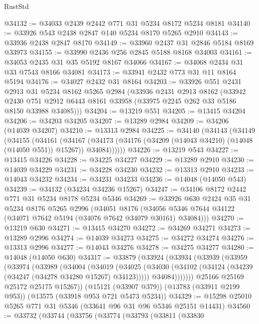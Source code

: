 \begin{lexlean}{RustStd}
\begin{coremodule}
@34132 := @34033 @2439 @2442 @771 @31 @5234 @8172 @5234 @8181
@34140 := @33926 @543 @2438 @2847 @140 @5234 @8170 @5265 @2910
@34143 := @33936 @2438 @2847 @8170
@34149 := @33960 @2437 @31 @2846 @5184 @8169 @33973
@34155 := @33990 @2436 @256 @2845 @5188 @8168 @34003
@34161 := @34053 @2435 @31 @35 @5192 @8167 @34066
@34167 := @34068 @2434 @31 @33 @7543 @8166 @34081
@34173 := @33941 @2432 @773 @31 @11 @8164 @5194
@34176 := @34027 @2432 @31 @8164
@34203 := @33926
    @551
    @2431
    @2913
    @31
    @5234
    @8162
    @5265
    @2984
    (@33936
      @2431
      @2913
      @8162
      (@33942
        @2430
        @751
        @2912
        @6443
        @8161
        @33958
        (@33975 @2245 @262 @33 @5186 @8150 @33988 @34085)))
@34204 := @13219 @551
@34205 := @13415 @34204
@34206 := @34203 @34205
@34207 := @13289 @2984
@34209 := @34206 (@14039 @34207)
@34210 := @13313 @2984
@34225 := @34140
    (@34143
      (@34149
        (@34155
          (@34161
            (@34167
              (@34173 (@34176 (@34209 (@14043 @34210) (@14048 (@14050 @551)) @15267)) @34084))))))
@34226 := @13219 @543
@34227 := @13415 @34226
@34228 := @34225 @34227
@34229 := @13289 @2910
@34230 := @14039 @34229
@34231 := @34228 @34230
@34232 := @13313 @2910
@34233 := @14043 @34232
@34234 := @34231 @34233
@34236 := @14048 (@14050 @543)
@34239 := @34132 (@34234 @34236 @15267)
@34247 := @34106 @8172 @2442 @771 @31 @5234 @8178 @5234 @5346
@34269 := @33926
    @630
    @2424
    @35
    @31
    @5234
    @8176
    @5265
    @2996
    (@34051
      @8176
      (@34056 @5346 @7644 @34122 (@34071 @7642 @5194 (@34076 @7642 @34079 @30161) @34084)))
@34270 := @13219 @630
@34271 := @13415 @34270
@34272 := @34269 @34271
@34273 := @13289 @2996
@34274 := @14039 @34273
@34275 := @34272 @34274
@34276 := @13313 @2996
@34277 := @14043 @34276
@34278 := @34275 @34277
@34280 := @14048 (@14050 @630)
@34317 := @33879
    (@33924
      (@33934
        (@33939
          (@33959
            (@33974
              (@33989
                (@34004
                  (@34019
                    (@34025
                      (@34030 (@34102 (@34124 (@34239 (@34247 (@34278 @34280 @15267) @34123)))))
                      @34084)))))))
        @25166
        @25169
        @25172
        @25175
        @15267))
    (@15121 (@33907 @379))
    (@13783 (@33911 @2199 @953))
    (@13575 (@33918 @953 @721 @5473 @5234))
@34329 := @15298 @25010 @5265 @771 @31 @5346 (@33641 @96 @31 @96 @5346 @25151 @14431)
@34560 := @33732
    (@33744
      (@33756
        (@33774
          (@33793
            (@33811
              (@33830

\end{coremodule}
\end{lexlean}
